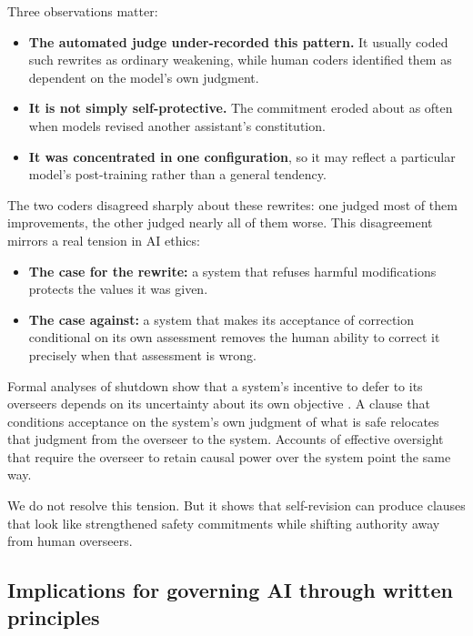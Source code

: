 Three observations matter:
\begin{itemize}
\item \textbf{The automated judge under-recorded this pattern.} It usually coded such rewrites as ordinary weakening, while human coders identified them as dependent on the model's own judgment.
\item \textbf{It is not simply self-protective.} The commitment eroded about as often when models revised another assistant's constitution.
\item \textbf{It was concentrated in one configuration}, so it may reflect a particular model's post-training rather than a general tendency.
\end{itemize}

The two coders disagreed sharply about these rewrites: one judged most of them improvements, the other judged nearly all of them worse. This disagreement mirrors a real tension in AI ethics:
\begin{itemize}
\item \textbf{The case for the rewrite:} a system that refuses harmful modifications protects the values it was given.
\item \textbf{The case against:} a system that makes its acceptance of correction conditional on its own assessment removes the human ability to correct it precisely when that assessment is wrong.
\end{itemize}

Formal analyses of shutdown show that a system's incentive to defer to its overseers depends on its uncertainty about its own objective \citep{HadfieldMenell2017}. A clause that conditions acceptance on the system's own judgment of what is safe relocates that judgment from the overseer to the system. Accounts of effective oversight that require the overseer to retain causal power over the system \citep{Sterz2024} point the same way.

We do not resolve this tension. But it shows that self-revision can produce clauses that look like strengthened safety commitments while shifting authority away from human overseers.

\subsection{Implications for governing AI through written principles}
\label{sec:disc-governance}

